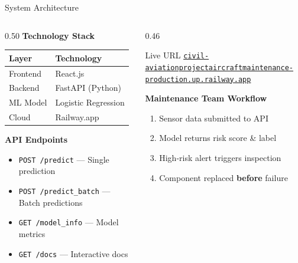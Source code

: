 \documentclass[aspectratio=169]{beamer}
\begin{document}
\begin{frame}{System Architecture}

  \begin{columns}[T]
    \begin{column}{0.50\textwidth}
      \textbf{Technology Stack}

      \vspace{0.3cm}
      \begin{tabular}{ll}
        \toprule
        \textbf{Layer} & \textbf{Technology} \\
        \midrule
        Frontend  & React.js \\
        Backend   & FastAPI (Python) \\
        ML Model  & Logistic Regression \\
        Cloud     & Railway.app \\
        \bottomrule
      \end{tabular}

      \vspace{0.4cm}

      \textbf{API Endpoints}
      \begin{itemize}
        \item \texttt{POST /predict} --- Single prediction
        \item \texttt{POST /predict\_batch} --- Batch predictions
        \item \texttt{GET /model\_info} --- Model metrics
        \item \texttt{GET /docs} --- Interactive docs
      \end{itemize}
    \end{column}

    \begin{column}{0.46\textwidth}
      \begin{exampleblock}{Live URL}
        \small\href{https://civil-aviationprojectaircraftmaintenance-production.up.railway.app}{\texttt{civil-aviationprojectaircraftmaintenance-\\production.up.railway.app}}
      \end{exampleblock}

      \vspace{0.3cm}

      \textbf{Maintenance Team Workflow}
      \begin{enumerate}
        \item Sensor data submitted to API
        \item Model returns risk score \& label
        \item High-risk alert triggers inspection
        \item Component replaced \textbf{before} failure
      \end{enumerate}
    \end{column}
  \end{columns}

\end{frame}
\end{document}
